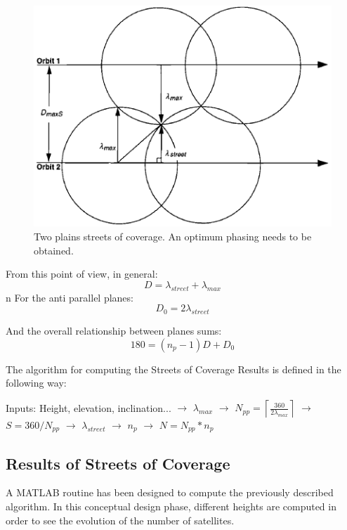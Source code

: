 \begin{figure}[H]
\begin{center}
\includegraphics[scale=0.7]{PolarOrbits/planeseps.png}
\caption[Two plains streets of coverage. An optimum phasing needs to be obtained]{Two plains streets of coverage. An optimum phasing needs to be obtained.\cite{ccar}}
\end{center}
\end{figure}

From this point of view, in general:
$$D = \lambda_{street} + \lambda_{max}$$
n
For the anti parallel planes:
$$D_{0} = 2\lambda_{street}$$

And the overall relationship between planes sums:
$$180 = (n_{p}-1)D + D_{0}$$

The algorithm for computing the Streets of Coverage Results is defined in the following way:

\begin{center}
Inputs: Height, elevation, inclination... 
$\rightarrow$
$\lambda_{max}$
$\rightarrow$
$N_{pp}=\left \lceil \frac{360}{2 \lambda_{max}}  \right \rceil$
$\rightarrow$
\newline
$S=360/N_{pp}$
$\rightarrow$
$\lambda_{street}$
$\rightarrow$
$n_{p}$
$\rightarrow$
$N=N_{pp}*n_{p}$
\end{center}

\subsection{Results of Streets of Coverage}
A MATLAB routine has been designed to compute the previously described algorithm. In this conceptual design phase, different heights are computed in order to see the evolution of the number of satellites.

